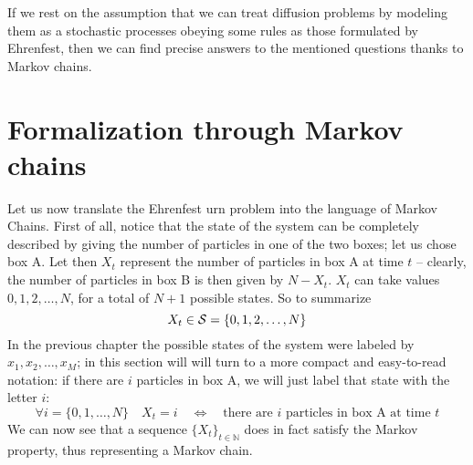 If we rest on the assumption that we can treat diffusion problems by modeling them as a stochastic processes obeying some rules as those formulated by Ehrenfest, then we can find precise answers to the mentioned questions thanks to Markov chains.

\section{Formalization through Markov chains}
Let us now translate the Ehrenfest urn problem into the language of Markov Chains. 
First of all, notice that the state of the system can be completely described by giving the number of particles in one of the two boxes; let us chose box A. Let then $X_t$ represent the number of particles in box A at time $t$ -- clearly, the number of particles in box B is then given by $N - X_t$. $X_t$ can take values $0, 1, 2, \dots, N$, for a total of $N + 1$ possible states. So to summarize
\begin{equation}
    X_t \in \mathcal{S} = \{ 0, 1, 2, \dots, N \}
\end{equation}
In the previous chapter the possible states of the system were labeled by $x_1, x_2, \dots, x_M$; in this section will will turn to a more compact and easy-to-read notation: if there are $i$ particles in box A, we will just label that state with the letter $i$:
\begin{equation}
    \forall i = \{0, 1, \dots, N \} \quad X_t = i \quad \Leftrightarrow \quad \text{there are $i$ particles in box A at time $t$}
\end{equation}
We can now see that a sequence $\{X_t\}_{t\in \mathbb{N}}$ does in fact satisfy the Markov property, thus representing a Markov chain.